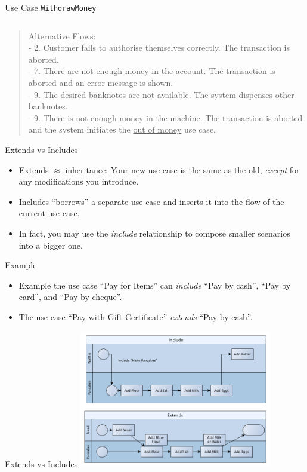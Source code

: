 \documentclass[10pt,t,a4paper]{beamer}
\begin{document}
\begin{frame}[fragile,shrink=15,label=sec-1-15]{Use Case \texttt{WithdrawMoney}}
\begin{center}
\begin{tabular}{ll}
\hline
\end{tabular}
\end{center}
\begin{verse}
Alternative Flows: \\
\hspace*{1em}- 2. Customer fails to authorise themselves correctly. The transaction is aborted. \\
\hspace*{1em}- 7. There are not enough money in the account. The transaction is aborted and an error message is shown. \\
\hspace*{1em}- 9. The desired banknotes are not available. The system dispenses other banknotes. \\
\hspace*{1em}- 9. There is not enough money in the machine. The transaction is aborted and the system initiates the \uline{out of money} use case. \\
\vspace*{1em}
\end{verse}
\end{frame}
\begin{frame}[label=sec-1-16]{Extends vs Includes}
\begin{itemize}
\item Extends $\approx$ inheritance: Your new use case is the same as the old, \emph{except} for any modifications you introduce.
\item Includes ``borrows'' a separate use case and inserts it into the flow of the current use case.
\item In fact, you may use the \emph{include} relationship to compose smaller scenarios into a bigger one.
\end{itemize}

\begin{block}{Example}
\begin{itemize}
\item Example the use case ``Pay for Items'' can \emph{include} ``Pay by cash'', ``Pay by card'', and ``Pay by cheque''.
\item The use case ``Pay with Gift Certificate'' \emph{extends} ``Pay by cash''.
\end{itemize}
\end{block}
\end{frame}
\begin{frame}[label=sec-1-17]{Extends vs Includes}
\includegraphics[height=6cm]{./IUseCaseIncludevsExtend.png}
\end{frame}
\end{document}
